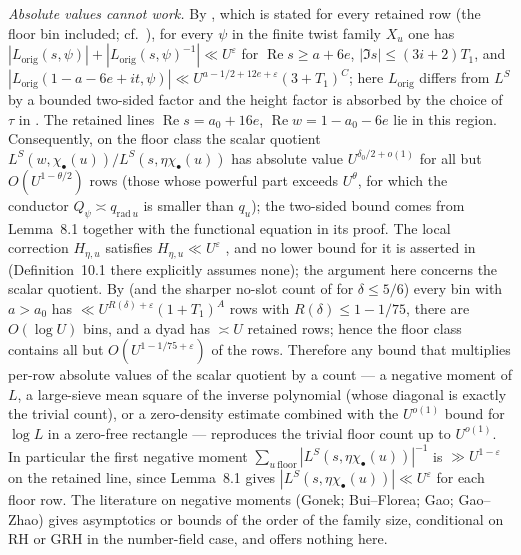 \documentclass[11pt]{article}
\renewcommand{\Re}{\operatorname{Re}}
\begin{document}
\emph{Absolute values cannot work.} By \cite[Lemma~8.1]{Ope26}, which is stated for every retained row (the floor bin included; cf.\ \cite[\S10.5]{Ope26}), for every $\psi$ in the finite twist family $X_u$ one has $|L_{\mathrm{orig}}(s,\psi)|+|L_{\mathrm{orig}}(s,\psi)^{-1}|\ll U^{\varepsilon}$ for $\Re s\ge a+6e$, $|\Im s|\le(3i+2)T_1$, and $|L_{\mathrm{orig}}(1-a-6e+it,\psi)|\ll U^{a-1/2+12e+\varepsilon}(3+T_1)^C$; here $L_{\mathrm{orig}}$ differs from $L^S$ by a bounded two-sided factor and the height factor is absorbed by the choice of $\tau$ in \cite[\S11]{Ope26}. The retained lines $\Re s=a_0+16e$, $\Re w=1-a_0-6e$ lie in this region. Consequently, on the floor class the scalar quotient $L^S(w,\chi_\bullet(u))/L^S(s,\eta\chi_\bullet(u))$ has absolute value $U^{\delta_0/2+o(1)}$ for all but $O(U^{1-\theta/2})$ rows (those whose powerful part exceeds $U^{\theta}$, for which the conductor $Q_\psi\asymp q_{\mathrm{rad}\,u}$ is smaller than $q_u$); the two-sided bound comes from Lemma~8.1 together with the functional equation in its proof. The local correction $H_{\eta,u}$ satisfies $H_{\eta,u}\ll U^{\varepsilon}$ \cite[Lemma~7.1]{Ope26}, and no lower bound for it is asserted in \cite{Ope26} (Definition~10.1 there explicitly assumes none); the argument here concerns the scalar quotient. By \cite[Prop.~9.2, (9.16)]{Ope26} (and the sharper no-slot count of \cite[Prop.~19.2]{Ope26} for $\delta\le5/6$) every bin with $a>a_0$ has $\ll U^{R(\delta)+\varepsilon}(1+T_1)^A$ rows with $R(\delta)\le1-1/75$, there are $O(\log U)$ bins, and a dyad has $\asymp U$ retained rows; hence the floor class contains all but $O(U^{1-1/75+\varepsilon})$ of the rows. Therefore any bound that multiplies per-row absolute values of the scalar quotient by a count --- a negative moment of $L$, a large-sieve mean square of the inverse polynomial (whose diagonal is exactly the trivial count), or a zero-density estimate combined with the $U^{o(1)}$ bound for $\log L$ in a zero-free rectangle --- reproduces the trivial floor count up to $U^{o(1)}$. In particular the first negative moment $\sum_{u\ \mathrm{floor}}|L^S(s,\eta\chi_\bullet(u))|^{-1}$ is $\gg U^{1-\varepsilon}$ on the retained line, since Lemma~8.1 gives $|L^S(s,\eta\chi_\bullet(u))|\ll U^{\varepsilon}$ for each floor row. The literature on negative moments (Gonek; Bui--Florea; Gao; Gao--Zhao) gives asymptotics or bounds of the order of the family size, conditional on RH or GRH in the number-field case, and offers nothing here.
\end{document}
